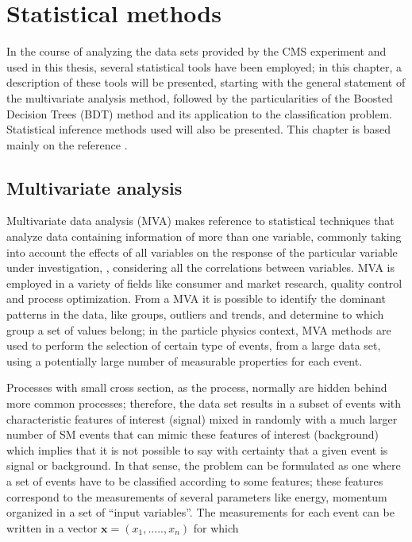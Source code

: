 \chapter{Statistical methods}\label{ch:stat}

In the course of analyzing the data sets provided by the CMS experiment and used in this thesis, several statistical tools have been employed; in this chapter, a description of these tools will be presented, starting with the general statement of the multivariate analysis method, followed by the particularities of the Boosted Decision Trees (BDT) method and its application to the classification problem. Statistical inference methods used will also be presented. This chapter is based mainly on the reference \cite{mva}.      

\section{Multivariate analysis}

Multivariate data analysis (MVA) makes reference to statistical techniques that analyze data containing information of more than one variable, commonly taking into account the effects of all variables on the response of the particular variable under investigation, \ie, considering all the correlations between variables. MVA is employed in a variety of fields like consumer and market research, quality control and process optimization. From a MVA it is possible to identify the dominant patterns in the data, like groups, outliers and trends, and determine to which group a set of values belong; in the particle physics context, MVA methods are used to perform the selection of certain type of events, from a large data set, using a potentially large number of measurable properties for each event.

Processes with small cross section, as the \tHq process, normally are hidden behind more common processes; therefore, the data set results in a subset of events with characteristic features of interest (signal) mixed in randomly with a much larger number of SM events that can mimic these features of interest (background) which implies that it is not possible to say with certainty that a given event is signal or background. In that sense, the problem can be formulated as one where a set of events have to be classified according to some features; these features correspond to the measurements of several parameters like energy, momentum organized in a set of ``input variables''. The measurements for each event can be written in a vector $\textbf{x}=(x_1,.....,x_n)$ for which

